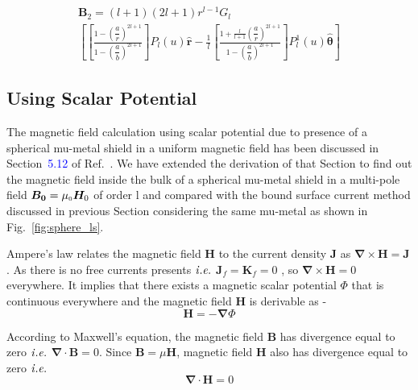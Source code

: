 \begin{multline}\label{B2}
    \bm B_2= (l+1)(2l+1)r^{l-1}G_l\\\left[\left[\frac{1-\left(\dfrac{a}{r}\right)^{2l+1}}{1-\left(\dfrac{a}{b}\right)^{2l+1}}\right] P_l(u) \bm{\hat{r}} -\frac{1}{l}\left[\frac{1+\frac{l}{l+1}\left(\dfrac{a}{r}\right)^{2l+1}}{1-\left(\dfrac{a}{b}\right)^{2l+1}}\right] P_l^1(u) \bm{\hat{\theta}}\right]
\end{multline}



\subsection{Using Scalar Potential}
The magnetic field calculation using scalar potential due to presence of a spherical mu-metal shield in a uniform magnetic field has been discussed in Section~\textcolor{blue}{5.12} of Ref.~\cite{jackson}. We have extended the derivation of that Section to find out the magnetic field inside the bulk of a spherical mu-metal shield in a multi-pole field \(\bm{B_0}= \mu_{\scriptscriptstyle 0} \bm H_0\) of order l and compared with the bound surface current method discussed in previous Section considering the same mu-metal as shown in Fig.~\ref{fig:sphere_ls}.


Ampere's law relates the magnetic field $\bm{H}$ to the current density $\bm{J}$ as \(\bm{\nabla}\times\bm{H}=\bm{J}\). As there is no free currents presents $\it{i.e.}$ \(\bm{J}_f=\bm{K}_f=0\) , so \(\bm{\nabla}\times\bm{H}=0\) everywhere. It implies that there exists a magnetic scalar potential \(\Phi\) that is continuous  everywhere and the  magnetic field $\bm{H}$ is derivable as -
\begin{equation}\label{H}
\bm{H}=-\bm{\nabla}\Phi
\end{equation} 

According to Maxwell's equation, the magnetic field $\bm{B}$ has divergence equal to zero $\it{i.e.}$ \(\bm{\nabla}\cdot\bm{B}=0\). Since \(\bm{B}=\mu\bm{H}\), magnetic field $\bm{H}$ also has divergence equal to zero $\it{i.e.}$
\begin{equation}\label{nablaH}
\bm{\nabla}\cdot\bm{H}=0
\end{equation}

